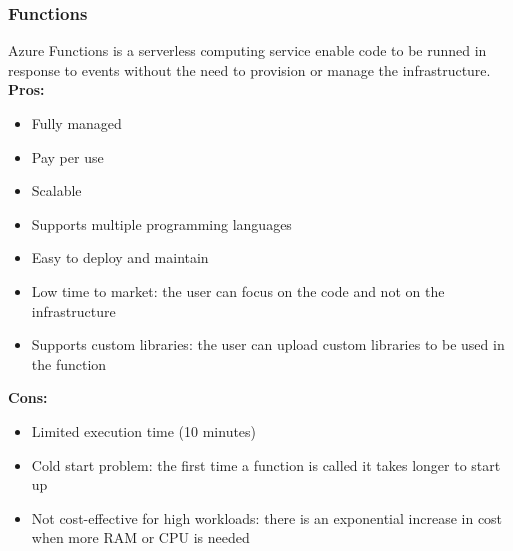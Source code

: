         \subsubsection{Functions}
        \label{azure:functions}
 Azure Functions is a serverless computing service enable code to be runned in response to events without the need to provision or manage the infrastructure.\\
        \textbf{Pros:}
        \begin{itemize}
            \item Fully managed
            \item Pay per use
            \item Scalable
            \item Supports multiple programming languages
            \item Easy to deploy and maintain
            \item Low time to market: the user can focus on the code and not on the infrastructure
            \item Supports custom libraries: the user can upload custom libraries to be used in the function
        \end{itemize}
        \textbf{Cons:}
        \begin{itemize}
            \item Limited execution time (10 minutes)
            \item Cold start problem: the first time a function is called it takes longer to start up
            \item Not cost-effective for high workloads: there is an exponential increase in cost when more RAM or CPU is needed
        \end{itemize}

